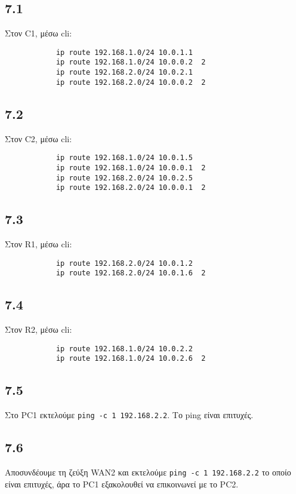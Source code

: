 \documentclass[a4paper, 12pt]{article}
\begin{document}
	\subsection*{7.1}
		Στον C1, μέσω cli:
		
		\begin{verbatim}
			ip route 192.168.1.0/24 10.0.1.1
			ip route 192.168.1.0/24 10.0.0.2  2
			ip route 192.168.2.0/24 10.0.2.1
			ip route 192.168.2.0/24 10.0.0.2  2
		\end{verbatim}

	\subsection*{7.2}
		Στον C2, μέσω cli:
		
		\begin{verbatim}
			ip route 192.168.1.0/24 10.0.1.5
			ip route 192.168.1.0/24 10.0.0.1  2
			ip route 192.168.2.0/24 10.0.2.5
			ip route 192.168.2.0/24 10.0.0.1  2
		\end{verbatim}
		
	\subsection*{7.3}
		Στον R1, μέσω cli:
		
		\begin{verbatim}
			ip route 192.168.2.0/24 10.0.1.2
			ip route 192.168.2.0/24 10.0.1.6  2
		\end{verbatim}

	\subsection*{7.4}
		Στον R2, μέσω cli:
		
		\begin{verbatim}
			ip route 192.168.1.0/24 10.0.2.2
			ip route 192.168.1.0/24 10.0.2.6  2
		\end{verbatim}

	\subsection*{7.5}
		Στο PC1 εκτελούμε \verb|ping -c 1 192.168.2.2|. Το ping είναι επιτυχές.

	\subsection*{7.6}
		Αποσυνδέουμε τη ζεύξη WAN2 και εκτελούμε \verb|ping -c 1 192.168.2.2| το οποίο είναι επιτυχές, άρα το PC1 εξακολουθεί να επικοινωνεί με το PC2.
\end{document}
